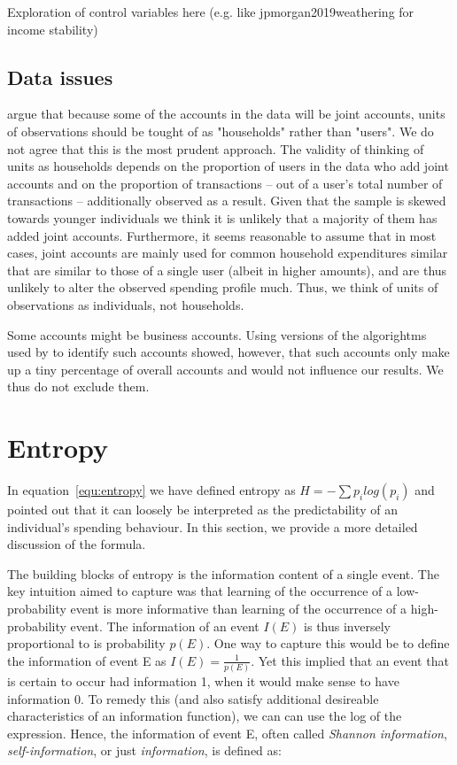 Exploration of control variables here (e.g. like jpmorgan2019weathering for
income stability)


\subsection{Data issues}%
\label{sub:data_issues}

\citet{bourquin2020effects} argue that because some of the accounts in the data
will be joint accounts, units of observations should be tought of as
"households" rather than "users". We do not agree that this is the most prudent
approach. The validity of thinking of units as households depends on the
proportion of users in the data who add joint accounts and on the proportion of
transactions -- out of a user's total number of transactions -- additionally observed as a
result. Given that the sample is skewed towards younger individuals we think it
is unlikely that a majority of them has added joint accounts. Furthermore, it
seems reasonable to assume that in most cases, joint accounts are mainly used
for common household expenditures similar that are similar to those of a single
user (albeit in higher amounts), and are thus unlikely to alter the observed
spending profile much. Thus, we think of units of observations as individuals,
not households. 

Some accounts might be business accounts. Using versions of the algorightms
used by \citet{bourquin2020effects} to identify such accounts showed, however,
that such accounts only make up a tiny percentage of overall accounts and would
not influence our results. We thus do not exclude them.


\section{Entropy}%
\label{sec:entropy}

In equation~\ref{equ:entropy} we have defined entropy as $H =
-\sum{p_i}log(p_i)$ and pointed out that it can loosely be interpreted as the predictability of an
individual's spending behaviour. In this section, we provide a more detailed
discussion of the formula.

The building blocks of entropy is the information content of a single event.
The key intuition \citet{shannon1948mathematical} aimed to capture was that
learning of the occurrence of a low-probability event is more informative than
learning of the occurrence of a high-probability event. The information of an
event $I(E)$ is thus inversely proportional to is probability $p(E)$. One way
to capture this would be to define the information of event E as $I(E) =
\frac{1}{p(E)}$. Yet this implied that an event that is certain to occur had
information 1, when it would make sense to have information 0. To remedy this
(and also satisfy additional desireable characteristics of an information
function), we can can use the log of the expression. Hence, the information of
event E, often called \textit{Shannon information}, \textit{self-information},
or just \textit{information}, is defined as:

